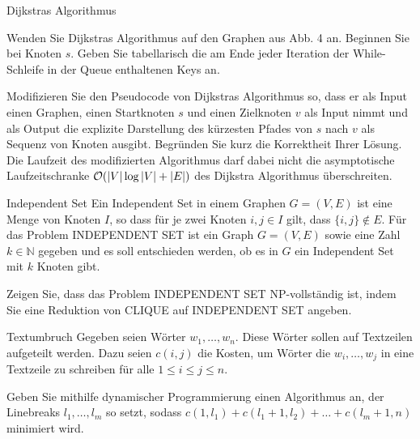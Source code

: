 \documentclass{exercisesheet}
\begin{document}
\begin{eexercises}{Dijkstras Algorithmus}{
  }
  \item Wenden Sie Dijkstras Algorithmus auf den Graphen aus Abb. 4 an. Beginnen Sie bei Knoten $s$. Geben Sie tabellarisch die am Ende jeder Iteration der While-Schleife in der Queue enthaltenen Keys an.
  \item Modifizieren Sie den Pseudocode von Dijkstras Algorithmus so, dass er als Input einen Graphen, einen Startknoten $s$ und einen Zielknoten $v$ als Input nimmt und als Output die explizite Darstellung des kürzesten Pfades von $s$ nach $v$ als Sequenz von Knoten ausgibt. Begründen Sie kurz die Korrektheit Ihrer Lösung. Die Laufzeit des modifizierten Algorithmus darf dabei nicht die asymptotische Laufzeitschranke $\mathcal{O}(|V| \log |V| + |E|)$ des Dijkstra Algorithmus überschreiten.
\end{eexercises}



\begin{exercise}{Independent Set}
  Ein Independent Set in einem Graphen $G = (V, E)$ ist eine Menge von Knoten $I$, so dass für je zwei Knoten $i, j \in I$ gilt, dass $\{i, j\} \notin E$. Für das Problem INDEPENDENT SET ist ein Graph $G = (V, E)$ sowie eine Zahl $k \in \mathbb{N}$ gegeben und es soll entschieden werden, ob es in $G$ ein Independent Set mit $k$ Knoten gibt.\par
  Zeigen Sie, dass das Problem INDEPENDENT SET NP-vollständig ist, indem Sie eine Reduktion von CLIQUE auf INDEPENDENT SET angeben.
\end{exercise}

\begin{exercise}{Textumbruch}
  Gegeben seien Wörter $w_1, \ldots, w_n$. Diese Wörter sollen auf Textzeilen aufgeteilt werden. Dazu seien $c(i, j)$ die Kosten, um Wörter die $w_i, \ldots, w_j$ in eine Textzeile zu schreiben für alle $1 \leq i \leq j \leq n$.\par
  Geben Sie mithilfe dynamischer Programmierung einen Algorithmus an, der Linebreaks $l_1, \ldots, l_m$ so setzt, sodass $c(1,l_1)+c(l_1 +1,l_2)+\ldots+c(l_m +1,n)$ minimiert wird.
\end{exercise}
\end{document}
